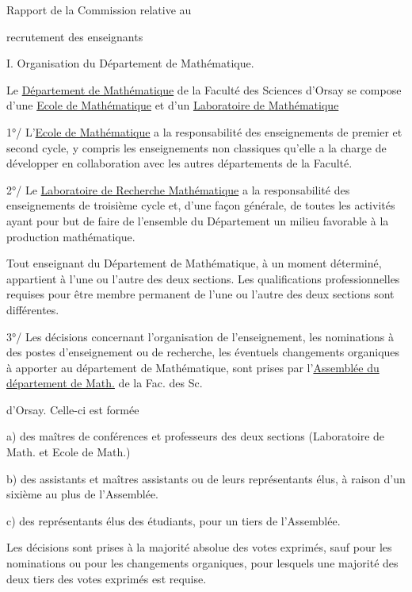 
\begin{center}
Rapport de la Commission relative au

recrutement des enseignants
\end{center}

I. Organisation du Département de Mathématique.

Le \uline{Département de Mathématique} de la Faculté des Sciences d'Orsay se compose d'une \uline{Ecole de Mathématique} et d'un \uline{Laboratoire de Mathématique}

1°/ L'\uline{Ecole de Mathématique} a la responsabilité des enseignements de premier et second cycle, y compris les enseignements non classiques qu'elle a la charge de développer en collaboration avec les autres départements de la Faculté.

2°/ Le \uline{Laboratoire de Recherche Mathématique} a la responsabilité des enseignements de troisième cycle et, d'une façon générale, de toutes les activités ayant pour but de faire de l'ensemble du Département un milieu favorable à la production mathématique.

Tout enseignant du Département de Mathématique, à un moment déterminé, appartient à l'une ou l'autre des deux sections. Les qualifications professionnelles requises pour être membre permanent de l'une ou l'autre des deux sections sont différentes.

3°/ Les décisions concernant l'organisation de l'enseignement, les nominations à des postes d'enseignement ou de recherche, les éventuels changements organiques à apporter au département de Mathématique, sont prises par l'\uline{Assemblée du département de Math.} de la Fac. des Sc.


d'Orsay. Celle-ci est formée

a) des maîtres de conférences et professeurs des deux sections (Laboratoire de Math. et Ecole de Math.)

b) des assistants et maîtres assistants ou de leurs représentants élus, à raison d'un sixième au plus de l'Assemblée.

c) des représentants élus des étudiants, pour un tiers de l'Assemblée.

Les décisions sont prises à la majorité absolue des votes exprimés, sauf pour les nominations ou pour les changements organiques, pour lesquels une majorité des deux tiers des votes exprimés est requise.

